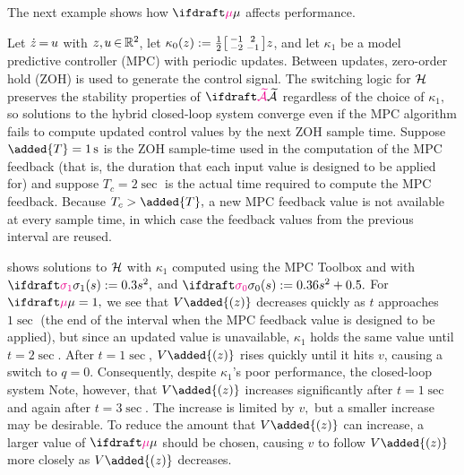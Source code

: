 
The next example shows how
$\vdiffcoeff$ affects performance.

\begin{example}[MPC]
\label{ex:MPC}
\newcommand{\fsampled}{{f_{s}}}
\newcommand{\zsampled}{{z_{s}}}
\newcommand{\usampled}{{u_{s}}}
\newcommand{\Tsample}{\added{T}}
\newcommand{\Tactual}{{T_{c}}}
Let $\squeezespaces{0.7}\zdot = u$ with $\squeezespaces{0.7}z, u\in\reals^2$,
let $\kappa_0(z) := \frac{1}{2}\bigl[ \begin{smallmatrix} -1 & 2 \\ -2 & -1 \end{smallmatrix} \bigr]z$,
and let $\kappa_1$ be a 
model predictive controller (MPC) with 
periodic updates.
Between updates, zero-order hold (ZOH) is used 
to generate the control signal.
The switching logic for ${\mathcal{H}}$ preserves 
the stability properties of $\calAX$ 
regardless of the choice of $\kappa_1,$
so solutions to the hybrid closed-loop system converge
even if the MPC algorithm fails to compute updated control 
values by the next ZOH sample time.
Suppose $\Tsample = 1\sec$ is the ZOH sample-time used in the 
computation of the MPC feedback
(that is, the duration that each input 
value is designed to be applied for)
and suppose $\Tactual = 2\sec$
is the actual time required to compute the MPC feedback. 
Because $\Tactual > \Tsample,$ a new MPC feedback value is 
not available at every sample time, 
in which case 
the feedback values from the previous interval are reused.

 shows solutions to ${\mathcal{H}}$ 
with $\kappa_1$ computed using the \Matlab MPC Toolbox
and with $\sigmaone(s) := 0.3 s^2,$ and 
$\sigmazero(s) := 0.36 s^2 + 0.5.$
For $\vdiffcoeff = 1,$ 
we see that $V\added{(z)}$ decreases quickly as $t$ approaches 
$1 \sec$ (the end of the interval when the 
MPC feedback value is designed to be applied), but 
since an updated value is unavailable, 
$\kappa_1$ holds the same value until $t=2\sec$. 
After $t = 1\sec$, 
$V\added{(z)}$ rises quickly until it hits $v$,
causing a switch to $q=0.$
Consequently, despite $\kappa_1$'s poor performance, 
the closed-loop system  %
Note, however, that $V\added{(z)}$ increases significantly 
after $t=1\sec$ and again after $t=3\sec$.
The increase is limited by $v,$ 
but a smaller increase may be desirable. 
To reduce the amount that $V\added{(z)}$ can increase,
a larger value of $\vdiffcoeff$ should be chosen, 
causing $v$ to follow $V\added{(z)}$ more closely as $V\added{(z)}$ decreases.
\end{example}


